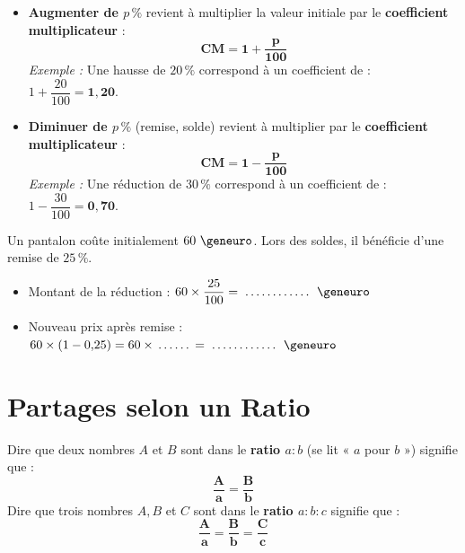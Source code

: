 \begin{cadremethode}
\begin{itemize}
    \item \textbf{Augmenter de $p\,\%$} revient à multiplier la valeur initiale par le \textbf{coefficient multiplicateur} :
    \[ \mathbf{CM = 1 + \frac{p}{100}} \]
    \textit{Exemple :} Une hausse de $20\,\%$ correspond à un coefficient de : $1 + \dfrac{20}{100} = \mathbf{1{,}20}$.
    \item \textbf{Diminuer de $p\,\%$} (remise, solde) revient à multiplier par le \textbf{coefficient multiplicateur} :
    \[ \mathbf{CM = 1 - \frac{p}{100}} \]
    \textit{Exemple :} Une réduction de $30\,\%$ correspond à un coefficient de : $1 - \dfrac{30}{100} = \mathbf{0{,}70}$.
\end{itemize}
\end{cadremethode}

\begin{cadreexemple}
Un pantalon coûte initialement $60\text{ \euro{}}$. Lors des soldes, il bénéficie d'une remise de $25\,\%$.
\begin{itemize}
    \item Montant de la réduction : $60 \times \dfrac{25}{100} = \pointille[2cm]\text{ \euro{}}$
    \item Nouveau prix après remise : $60 \times (1 - 0{,}25) = 60 \times \pointille[1cm] = \pointille[2cm]\text{ \euro{}}$
\end{itemize}
\end{cadreexemple}

\section{Partages selon un Ratio}

\begin{cadredef}
Dire que deux nombres $A$ et $B$ sont dans le \textbf{ratio $a : b$} (se lit « $a$ pour $b$ ») signifie que :
\[ \mathbf{\frac{A}{a} = \frac{B}{b}} \]
Dire que trois nombres $A, B$ et $C$ sont dans le \textbf{ratio $a : b : c$} signifie que :
\[ \mathbf{\frac{A}{a} = \frac{B}{b} = \frac{C}{c}} \]
\end{cadredef}

